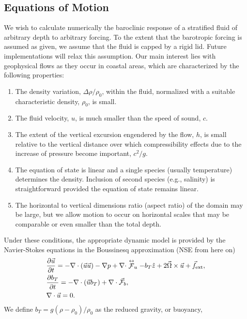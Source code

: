 \documentclass[12pt]{article}
\begin{document}
\subsection{Equations of Motion}\label{sec:eom}
We wish to calculate numerically the baroclinic response of a
stratified fluid 
of arbitrary depth to arbitrary forcing. To the extent that the barotropic
forcing is assumed as given, we assume that the fluid is capped by a rigid
lid. Future implementations will relax this assumption. 
Our main interest lies with geophysical flows as they occur in coastal
areas, which are characterized by the following properties: 
\begin{enumerate}
\item The density variation, $\Delta\rho/\rho_0$, within the fluid, 
normalized with a suitable 
characteristic density, $\rho_0$, is small.
\item The fluid velocity, $u$, is much smaller than the speed of sound, $c$. 
\item The extent of the vertical excursion engendered by the flow, $h$, is
  small relative to the vertical distance over which compressibility
  effects due to the increase of pressure become important, $c^2/g$. 
 \item The equation of state is linear and a single species (usually
  temperature) determines the density. Inclusion of second species (e.g.,
  salinity) is straightforward provided the equation of state remains linear. 
\item The horizontal to vertical dimensions ratio (aspect ratio) 
of the domain may be large, but we allow motion to occur on horizontal scales
that may be comparable or even smaller than the total depth. 
\end{enumerate}  
Under these conditions, the appropriate dynamic model is provided by the 
 Navier-Stokes equations in the Boussinesq approximation (NSE
from here on) \cite{Cushman1994} 
\begin{subequations}\label{NSE}\begin{align}
  &\frac{\partial {\vec{u}}}{\partial t} = -\nabla\cdot\left(\vec{u} \vec{u}\right) - \nabla p +
    \nabla\cdot\stackrel{\leftrightarrow}{{\cal F}}_u - b_T \hat{z} + 2\vec{\Omega}\times\vec{u}+\vec{f}_\text{ext}, \\
  &\frac{\partial {b_T}}{\partial t} = -\nabla \cdot \left( \vec{u} b_T \right) +\nabla\cdot\vec{\cal F}_b,\\
  &\nabla \cdot \vec{u} = 0.
\end{align}\end{subequations}
We define $b_T=g (\rho-\rho_0)/\rho_0$ as the reduced gravity, or buoyancy,
\end{document}
